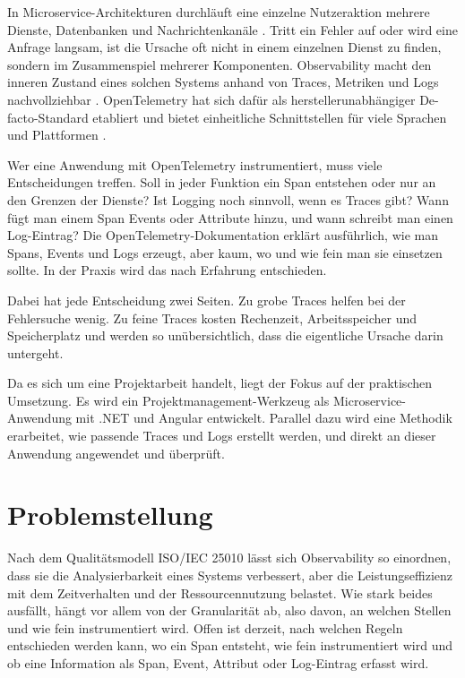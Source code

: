 \documentclass[11pt, a4paper]{article}
\begin{document}
In Microservice-Architekturen durchläuft eine einzelne Nutzeraktion mehrere Dienste, Datenbanken und Nachrichtenkanäle \cite{newman2021microservices}. Tritt ein Fehler auf oder wird eine Anfrage langsam, ist die Ursache oft nicht in einem einzelnen Dienst zu finden, sondern im Zusammenspiel mehrerer Komponenten. Observability macht den inneren Zustand eines solchen Systems anhand von Traces, Metriken und Logs nachvollziehbar \cite{majors2022observability}. OpenTelemetry hat sich dafür als herstellerunabhängiger De-facto-Standard etabliert und bietet einheitliche Schnittstellen für viele Sprachen und Plattformen \cite{otel_cncf,otel_docs}.

Wer eine Anwendung mit OpenTelemetry instrumentiert, muss viele Entscheidungen treffen. Soll in jeder Funktion ein Span entstehen oder nur an den Grenzen der Dienste? Ist Logging noch sinnvoll, wenn es Traces gibt? Wann fügt man einem Span Events oder Attribute hinzu, und wann schreibt man einen Log-Eintrag? Die OpenTelemetry-Dokumentation erklärt ausführlich, wie man Spans, Events und Logs erzeugt, aber kaum, wo und wie fein man sie einsetzen sollte. In der Praxis wird das nach Erfahrung entschieden.

Dabei hat jede Entscheidung zwei Seiten. Zu grobe Traces helfen bei der Fehlersuche wenig. Zu feine Traces kosten Rechenzeit, Arbeitsspeicher und Speicherplatz und werden so unübersichtlich, dass die eigentliche Ursache darin untergeht.

Da es sich um eine Projektarbeit handelt, liegt der Fokus auf der praktischen Umsetzung. Es wird ein Projektmanagement-Werkzeug als Microservice-Anwendung mit .NET und Angular entwickelt. Parallel dazu wird eine Methodik erarbeitet, wie passende Traces und Logs erstellt werden, und direkt an dieser Anwendung angewendet und überprüft.

\section{Problemstellung}

Nach dem Qualitätsmodell ISO/IEC 25010 \cite{iso25010} lässt sich Observability so einordnen, dass sie die Analysierbarkeit eines Systems verbessert, aber die Leistungseffizienz mit dem Zeitverhalten und der Ressourcennutzung belastet. Wie stark beides ausfällt, hängt vor allem von der Granularität ab, also davon, an welchen Stellen und wie fein instrumentiert wird. Offen ist derzeit, nach welchen Regeln entschieden werden kann, wo ein Span entsteht, wie fein instrumentiert wird und ob eine Information als Span, Event, Attribut oder Log-Eintrag erfasst wird.
\end{document}
